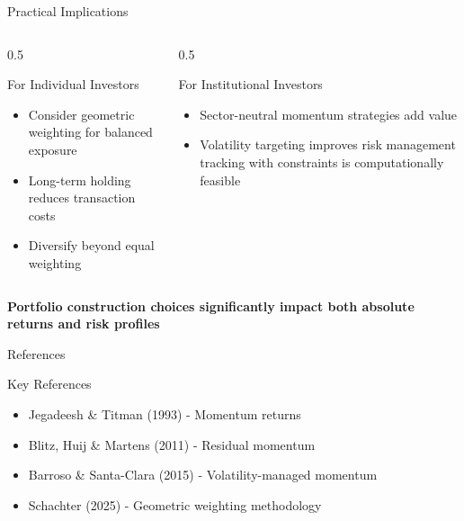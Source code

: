 \documentclass[12pt, aspectratio=43]{beamer}
\begin{document}
	\begin{frame}{Practical Implications}
		\begin{columns}[T]
			\begin{column}{0.5\textwidth}
				\begin{block}{For Individual Investors}
					\begin{itemize}
						\item Consider geometric weighting for balanced exposure
						\item Long-term holding reduces transaction costs
						\item Diversify beyond equal weighting
					\end{itemize}
				\end{block}
			\end{column}
			\begin{column}{0.5\textwidth}
				\begin{block}{For Institutional Investors}
					\begin{itemize}
						\item Sector-neutral momentum strategies add value
						\item Volatility targeting improves risk management
						\index tracking with constraints is computationally feasible
					\end{itemize}
				\end{block}
			\end{column}
		\end{columns}
		
		\vspace{2em}
		
		\centering
		\color{darkorange}\textbf{Portfolio construction choices significantly impact both absolute returns and risk profiles}
	\end{frame}
	
	\begin{frame}{References}
		\small
		\begin{block}{Key References}
			\begin{itemize}
				\item Jegadeesh \& Titman (1993) - Momentum returns
				\item Blitz, Huij \& Martens (2011) - Residual momentum
				\item Barroso \& Santa-Clara (2015) - Volatility-managed momentum
				\item Schachter (2025) - Geometric weighting methodology
			\end{itemize}
		\end{block}
	\end{frame}
	
\end{document}

